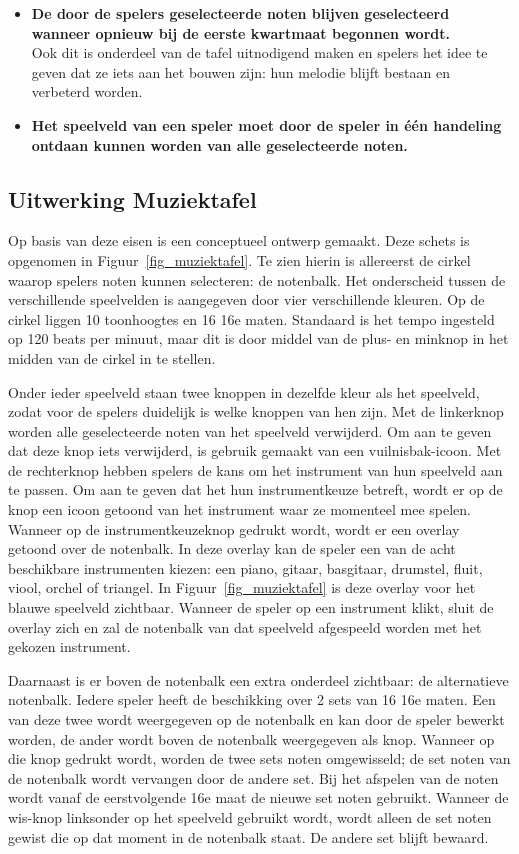 \documentclass{acm}
\begin{document}
\begin{itemize}
	\item \textbf{De door de spelers geselecteerde noten blijven geselecteerd wanneer opnieuw bij de eerste kwartmaat begonnen wordt.} \\ Ook dit is onderdeel van de tafel uitnodigend maken en spelers het idee te geven dat ze iets aan het bouwen zijn: hun melodie blijft bestaan en verbeterd worden.
	\item \textbf{Het speelveld van een speler moet door de speler in \'e\'en handeling ontdaan kunnen worden van alle geselecteerde noten.}
\end{itemize}

\subsection{Uitwerking Muziektafel}
Op basis van deze eisen is een conceptueel ontwerp gemaakt. Deze schets is opgenomen in Figuur~\ref{fig_muziektafel}. Te zien hierin is allereerst de cirkel waarop spelers noten kunnen selecteren: de notenbalk. Het onderscheid tussen de verschillende speelvelden is aangegeven door vier verschillende kleuren. Op de cirkel liggen 10 toonhoogtes en 16 16e maten. Standaard is het tempo ingesteld op 120 beats per minuut, maar dit is door middel van de plus- en minknop in het midden van de cirkel in te stellen.

Onder ieder speelveld staan twee knoppen in dezelfde kleur als het speelveld, zodat voor de spelers duidelijk is welke knoppen van hen zijn. Met de linkerknop worden alle geselecteerde noten van het speelveld verwijderd. Om aan te geven dat deze knop iets verwijderd, is gebruik gemaakt van een vuilnisbak-icoon. Met de rechterknop hebben spelers de kans om het instrument van hun speelveld aan te passen. Om aan te geven dat het hun instrumentkeuze betreft, wordt er op de knop een icoon getoond van het instrument waar ze momenteel mee spelen. Wanneer op de instrumentkeuzeknop gedrukt wordt, wordt er een overlay getoond over de notenbalk. In deze overlay kan de speler een van de acht beschikbare instrumenten kiezen: een piano, gitaar, basgitaar, drumstel, fluit, viool, orchel of triangel. In Figuur~\ref{fig_muziektafel} is deze overlay voor het blauwe speelveld zichtbaar. Wanneer de speler op een instrument klikt, sluit de overlay zich en zal de notenbalk van dat speelveld afgespeeld worden met het gekozen instrument.

Daarnaast is er boven de notenbalk een extra onderdeel zichtbaar: de alternatieve notenbalk. Iedere speler heeft de beschikking over 2 sets van 16 16e maten. Een van deze twee wordt weergegeven op de notenbalk en kan door de speler bewerkt worden, de ander wordt boven de notenbalk weergegeven als knop. Wanneer op die knop gedrukt wordt, worden de twee sets noten omgewisseld; de set noten van de notenbalk wordt vervangen door de andere set. Bij het afspelen van de noten wordt vanaf de eerstvolgende 16e maat de nieuwe set noten gebruikt. Wanneer de wis-knop linksonder op het speelveld gebruikt wordt, wordt alleen de set noten gewist die op dat moment in de notenbalk staat. De andere set blijft bewaard.
\end{document}
